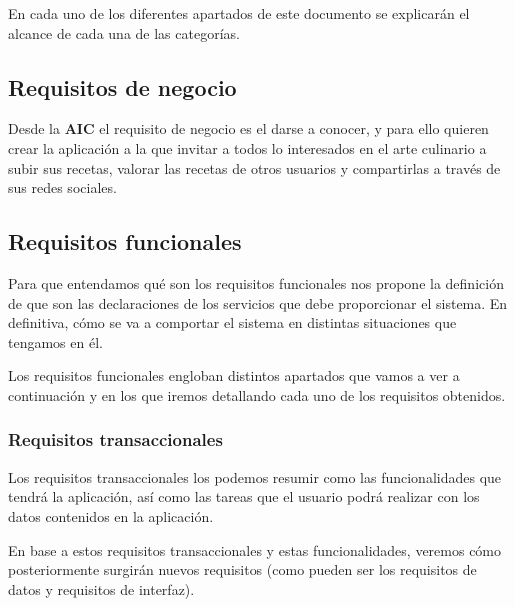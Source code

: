 \documentclass{\ClassPath/viu-tfm-template}
\begin{document}
En cada uno de los diferentes apartados de este documento se explicarán el alcance de cada una de las categorías.


\subsection{Requisitos de negocio}
Desde la \textbf{AIC} el requisito de negocio es el darse a conocer, y para ello quieren crear la aplicación a la que invitar a todos lo interesados en el arte culinario a subir sus recetas, valorar las recetas de otros usuarios y compartirlas a través de sus redes sociales.


\subsection{Requisitos funcionales}
Para que entendamos qué son los requisitos funcionales \textcite{Sommerville2005} nos propone la definición de que son las declaraciones de los servicios que debe proporcionar el sistema. En definitiva, cómo se va a comportar el sistema en distintas situaciones que tengamos en él.

Los requisitos funcionales engloban distintos apartados que vamos a ver a continuación y en los que iremos detallando cada uno de los requisitos obtenidos.


\subsubsection{Requisitos transaccionales}
Los requisitos transaccionales los podemos resumir como las funcionalidades que tendrá la aplicación, así como las tareas que el usuario podrá realizar con los datos contenidos en la aplicación.

En base a estos requisitos transaccionales y estas funcionalidades, veremos cómo posteriormente surgirán nuevos requisitos (como pueden ser los requisitos de datos y requisitos de interfaz).

\setcounter{reqno}{1}
\end{document}
